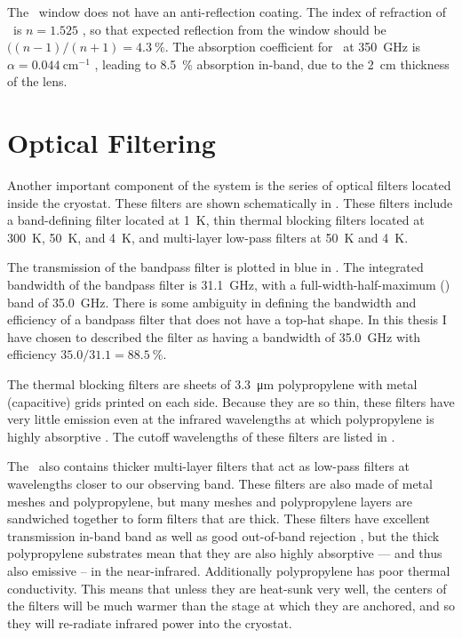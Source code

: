 The \HDPE\ window does not have an anti-reflection coating.
The index of refraction of \HDPE\ is $n=1.525$ \cite{lamb_miscellaneous_1996}, so that expected reflection from the window should be $( (n-1)/(n+1) = \SI{4.3}{\percent}$.
The absorption coefficient for \HDPE\ at \SI{350}{\GHz} is $\alpha = \SI{0.044}{\cm^{-1}}$ \cite{lamb_miscellaneous_1996}, leading to \SI{8.5}{\percent} absorption in-band, due to the \SI{2}{\cm} thickness of the lens.

\section{Optical Filtering} \label{sec:ch4-filters}

Another important component of the system is the series of optical filters located inside the cryostat.
These filters are shown schematically in .
These filters include a band-defining filter located at \SI{1}{\K}, thin thermal blocking filters located at \SI{300}{\K}, \SI{50}{\K}, and \SI{4}{\K}, and multi-layer low-pass filters at \SI{50}{\K} and \SI{4}{\K}.

The transmission of the bandpass filter is plotted in blue in .
The integrated bandwidth of the bandpass filter is \SI{31.1}{\GHz}, with a full-width-half-maximum (\FWHM) band of \SI{35.0}{\GHz}.
There is some ambiguity in defining the bandwidth and efficiency of a bandpass filter that does not have a top-hat shape.
In this thesis I have chosen to described the filter as having a bandwidth of \SI{35.0}{\GHz} with efficiency $35.0 / 31.1 = \SI{88.5}{\percent}$.

The thermal blocking filters are sheets of \SI{3.3}{\um} polypropylene with metal (capacitive) grids printed on each side.
Because they are so thin, these filters have very little emission even at the infrared wavelengths at which polypropylene is highly absorptive \cite{tucker_thermal_2006}.
The cutoff wavelengths of these filters are listed in .

The \Imager\ also contains thicker multi-layer filters that act as low-pass filters at wavelengths closer to our observing band.
These filters are also made of metal meshes and polypropylene, but many meshes and polypropylene layers are sandwiched together to form filters that are  thick.
These filters have excellent transmission in-band band as well as good out-of-band rejection \cite{ade_review_2006}, but the thick polypropylene substrates mean that they are also highly absorptive --- and thus also emissive -- in the near-infrared.
Additionally polypropylene has poor thermal conductivity.
This means that unless they are heat-sunk very well, the centers of the filters will be much warmer than the stage at which they are anchored, and so they will re-radiate infrared power into the cryostat.

